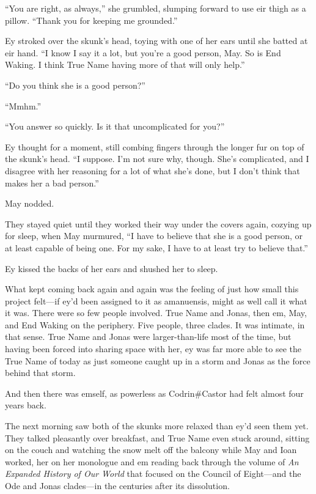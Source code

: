 ``You are right, as always,'' she grumbled, slumping forward to use eir thigh as a pillow. ``Thank you for keeping me grounded.''

Ey stroked over the skunk's head, toying with one of her ears until she batted at eir hand. ``I know I say it a lot, but you're a good person, May. So is End Waking. I think True Name having more of that will only help.''

``Do you think she is a good person?''

``Mmhm.''

``You answer so quickly. Is it that uncomplicated for you?''

Ey thought for a moment, still combing fingers through the longer fur on top of the skunk's head. ``I suppose. I'm not sure why, though. She's complicated, and I disagree with her reasoning for a lot of what she's done, but I don't think that makes her a bad person.''

May nodded.

They stayed quiet until they worked their way under the covers again, cozying up for sleep, when May murmured, ``I have to believe that she is a good person, or at least capable of being one. For my sake, I have to at least try to believe that.''

Ey kissed the backs of her ears and shushed her to sleep.

What kept coming back again and again was the feeling of just how small this project felt—if ey'd been assigned to it as amanuensis, might as well call it what it was. There were so few people involved. True Name and Jonas, then em, May, and End Waking on the periphery. Five people, three clades. It was intimate, in that sense. True Name and Jonas were larger-than-life most of the time, but having been forced into sharing space with her, ey was far more able to see the True Name of today as just someone caught up in a storm and Jonas as the force behind that storm.

And then there was emself, as powerless as Codrin\#Castor had felt almost four years back.

The next morning saw both of the skunks more relaxed than ey'd seen them yet. They talked pleasantly over breakfast, and True Name even stuck around, sitting on the couch and watching the snow melt off the balcony while May and Ioan worked, her on her monologue and em reading back through the volume of \emph{An Expanded History of Our World} that focused on the Council of Eight—and the Ode and Jonas clades—in the centuries after its dissolution.

